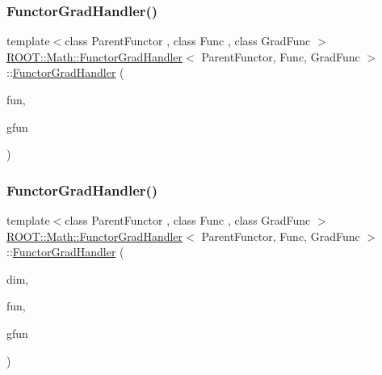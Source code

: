 \subsubsection{\texorpdfstring{FunctorGradHandler()}{FunctorGradHandler()}\hspace{0.1cm}{\footnotesize\ttfamily [3/6]}}
{\footnotesize\ttfamily template$<$class Parent\+Functor , class Func , class Grad\+Func $>$ \\
\mbox{\hyperlink{classROOT_1_1Math_1_1FunctorGradHandler}{R\+O\+O\+T\+::\+Math\+::\+Functor\+Grad\+Handler}}$<$ Parent\+Functor, Func, Grad\+Func $>$\+::\mbox{\hyperlink{classROOT_1_1Math_1_1FunctorGradHandler}{Functor\+Grad\+Handler}} (\begin{DoxyParamCaption}\item[{const Func \&}]{fun,  }\item[{const Grad\+Func \&}]{gfun }\end{DoxyParamCaption})\hspace{0.3cm}{\ttfamily [inline]}}

\mbox{\label{classROOT_1_1Math_1_1FunctorGradHandler_a5d5fdce3fadf4956e92c0057471e75a6}} 
\subsubsection{\texorpdfstring{FunctorGradHandler()}{FunctorGradHandler()}\hspace{0.1cm}{\footnotesize\ttfamily [4/6]}}
{\footnotesize\ttfamily template$<$class Parent\+Functor , class Func , class Grad\+Func $>$ \\
\mbox{\hyperlink{classROOT_1_1Math_1_1FunctorGradHandler}{R\+O\+O\+T\+::\+Math\+::\+Functor\+Grad\+Handler}}$<$ Parent\+Functor, Func, Grad\+Func $>$\+::\mbox{\hyperlink{classROOT_1_1Math_1_1FunctorGradHandler}{Functor\+Grad\+Handler}} (\begin{DoxyParamCaption}\item[{unsigned int}]{dim,  }\item[{const Func \&}]{fun,  }\item[{const Grad\+Func \&}]{gfun }\end{DoxyParamCaption})\hspace{0.3cm}{\ttfamily [inline]}}

